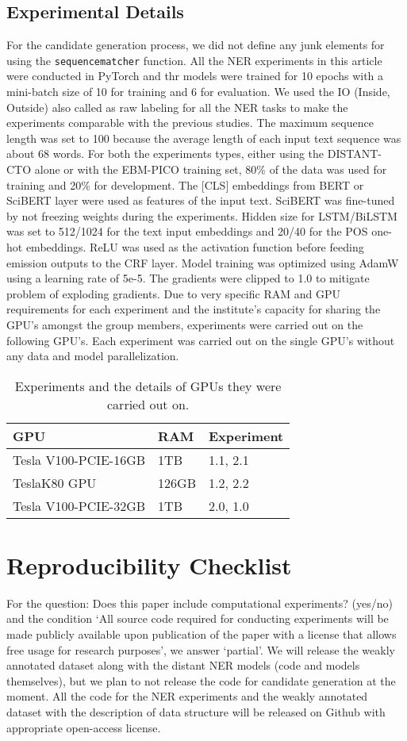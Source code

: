 \documentclass[letterpaper]{article} %
\begin{document}
\subsection{Experimental Details}
\label{app:expdet}
%
For the candidate generation process, we did not define any junk elements for using the {\tt sequencematcher} function.
All the NER experiments in this article were conducted in PyTorch and thr models were trained for 10 epochs with a mini-batch size of 10 for training and 6 for evaluation.
We used the IO (Inside, Outside) also called as raw labeling for all the NER tasks to make the experiments comparable with the previous studies.
The maximum sequence length was set to 100 because the average length of each input text sequence was about 68 words.
For both the experiments types, either using the DISTANT-CTO alone or with the EBM-PICO training set, 80\% of the data was used for training and 20\% for development.
The [CLS] embeddings from BERT or SciBERT layer were used as features of the input text.
SciBERT was fine-tuned by not freezing weights during the experiments.
Hidden size for LSTM/BiLSTM was set to 512/1024 for the text input embeddings and 20/40 for the POS one-hot embeddings.
ReLU was used as the activation function before feeding emission outputs to the CRF layer.
Model training was optimized using AdamW using a learning rate of 5e-5.
The gradients were clipped to 1.0 to mitigate problem of exploding gradients.
Due to very specific RAM and GPU requirements for each experiment and the institute's capacity for sharing the GPU's amongst the group members, experiments were carried out on the following GPU's.
Each experiment was carried out on the single GPU's without any data and model parallelization.
%
%
\begin{table}[htp]
\centering
\begin{tabular}{l|l|l}
\hline 
\textbf{GPU} & \textbf{RAM} & \textbf{ Experiment }  \\
\hline
Tesla V100-PCIE-16GB & 1TB  & 1.1, 2.1\\
TeslaK80 GPU & 126GB & 1.2, 2.2\\
Tesla V100-PCIE-32GB & 1TB   & 2.0, 1.0\\
\hline
\end{tabular}
\caption{Experiments and the details of GPUs they were carried out on.}
\label{table:exp_gpu} 
\end{table}
%
%
%
\section{Reproducibility Checklist}
\label{check}
%
For the question: Does this paper include computational experiments? (yes/no) and the condition `All source code required for conducting experiments will be made publicly available upon publication of the paper with a license that allows free usage for research purposes', we answer `partial'.
We will release the weakly annotated dataset along with the distant NER models (code and models themselves), but we plan to not release the code for candidate generation at the moment.
All the code for the NER experiments and the weakly annotated dataset with the description of data structure will be released on Github with appropriate open-access license.
%
%
%
\end{document}
